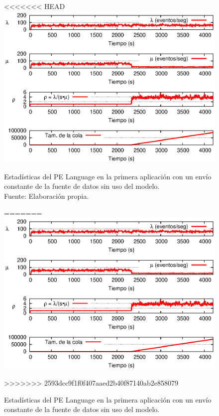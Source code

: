 \begin{figure}[!ht]
<<<<<<< HEAD
    \centering
    \captionsetup{justification=centering}
    \includegraphics[scale=1]{images/exp/app1/uniform/sm/statusLanguagePE.eps}
    \caption[Estadísticas del PE Language en la primera aplicación con un envío constante de la fuente de datos sin uso del modelo.]{Estadísticas del PE Language en la primera aplicación con un envío constante de la fuente de datos sin uso del modelo.\\Fuente: Elaboración propia.}
=======
\centering
    \includegraphics[scale=1.1]{images/exp/app1/uniform/sm/statusLanguagePE.eps}
    \caption{Estad\'isticas del PE Language en la primera aplicaci\'on con un env\'io constante de la fuente de datos sin uso del modelo.}
>>>>>>> 2593dcc9f1f0f407aaed2b40f87140ab2e858079
    \label{fig:app1-uniform-statusLanguagePE-sm}
\end{figure}

